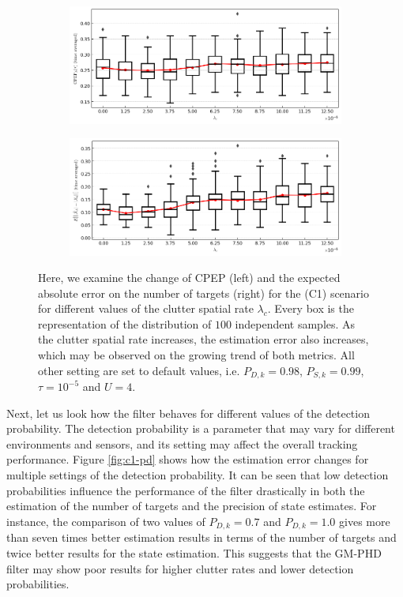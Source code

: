 \begin{figure}
    \centering
    \begin{subfigure}[]{0.48\linewidth}
        \centering
        \includegraphics[width=\linewidth]{figures/c1-clutter-cpep.png}
    \end{subfigure}
    \hfill
    \begin{subfigure}[]{0.48\linewidth}
        \centering
        \includegraphics[width=\linewidth]{figures/c1-clutter-eae.png}
    \end{subfigure}
  \caption[(C1). Change of performance depending on the clutter rate.]{Here, we examine the change of CPEP (left) and the expected absolute error on the number of targets (right) for the (C1) scenario for different values of the clutter spatial rate $\lambda_c$. Every box is the representation of the distribution of $100$ independent samples. As the clutter spatial rate increases, the estimation error also increases, which may be observed on the growing trend of both metrics. All other setting are set to default values, i.e. $P_{D,k} = 0.98$, $P_{S,k} = 0.99$, $\tau = 10^{-5}$ and $U = 4$.}
  \label{fig:c1-clutter}
\end{figure}

Next, let us look how the filter behaves for different values of the detection probability. The detection probability is a parameter that may vary for different environments and sensors, and its setting may affect the overall tracking performance. Figure \ref{fig:c1-pd} shows how the estimation error changes for multiple settings of the detection probability. It can be seen that low detection probabilities influence the performance of the filter drastically in both the estimation of the number of targets and the precision of state estimates. For instance, the comparison of two values of $P_{D,k} = 0.7$ and $P_{D,k} = 1.0$ gives more than seven times better estimation results in terms of the number of targets and twice better results for the state estimation. This suggests that the GM-PHD filter may show poor results for higher clutter rates and lower detection probabilities.

